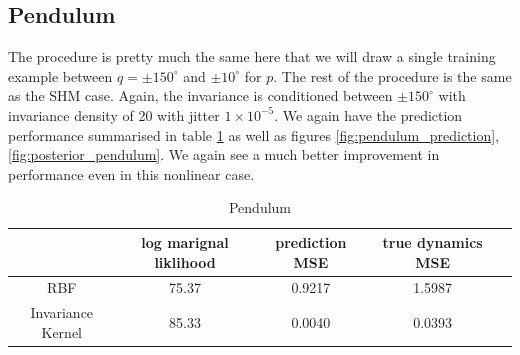 \documentclass{statsmsc}
\begin{document}
\subsection{Pendulum}
The procedure is pretty much the same here that we will draw a single training example between $q=\pm 150^{\circ}$ and $\pm 10^{\circ}$ for $p$.
The rest of the procedure is the same as the SHM case.
Again, the invariance is conditioned between $\pm 150^{\circ}$ with invariance density of 20 with jitter $1\times 10^{-5}$.
We again have the prediction performance summarised in table \ref{tab:pendulum_performance} as well as figures \ref{fig:pendulum_prediction}, \ref{fig:posterior_pendulum}.
We again see a much better improvement in performance even in this nonlinear case. 
\begin{table}[H]
  \centering
  \begin{tabular}{ c c c c c}
    \hline
                    & log marignal liklihood &  prediction MSE & true dynamics MSE\\
                    \hline
RBF & 75.37 & 0.9217 & 1.5987 \\
Invariance Kernel & 85.33 & 0.0040 & 0.0393 \\
    \hline
  \end{tabular}
  \caption{Pendulum }
  \label{tab:pendulum_performance}
\end{table}
\end{document}
